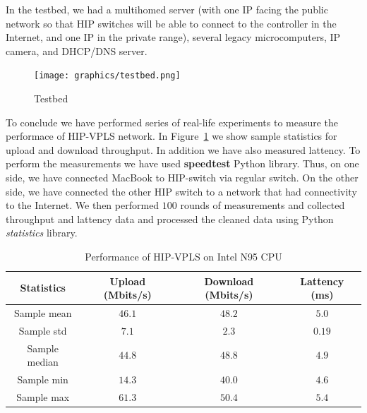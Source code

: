 In the testbed, we had a multihomed server (with one IP facing 
the public network so that HIP switches will be able to connect to 
the controller in the Internet, and one IP in the private range), 
several legacy microcomputers, IP camera, and DHCP/DNS server.

\begin{figure}[h!]
    \centering
    \texttt{[image: graphics/testbed.png]}
    \caption{Testbed}
    \label{fig:testbed}
\end{figure}

To conclude we have performed series of real-life experiments to measure the 
performace of HIP-VPLS network. In Figure~\ref{tab:vpls-performance} we show
sample statistics for upload and download throughput. In addition we have also
measured lattency. To perform the measurements we have used {\bf speedtest}
Python library. Thus, on one side, we have connected MacBook to HIP-switch via regular
switch. On the other side, we have connected the other HIP switch to a network 
that had connectivity to the Internet. We then performed $100$ rounds of measurements
and collected throughput and lattency data and processed the cleaned data using Python
{\it statistics} library.

\begin{table}
    \centering
    \begin{tabular}{|c|c|c|c|}
    \hline
    Statistics     & Upload (Mbits/s)        & Download (Mbits/s)     & Lattency (ms) \\\hline
    Sample mean    & $46.1$                  & $48.2$                 & $5.0$         \\
    Sample std     & $7.1$                   & $2.3$                  & $0.19$        \\
    Sample median  & $44.8$                  & $48.8$                 & $4.9$         \\
    Sample min     & $14.3$                  & $40.0$                 & $4.6$         \\
    Sample max     & $61.3$                  & $50.4$                 & $5.4$         \\
    \hline
    \end{tabular}
    \caption{Performance of HIP-VPLS on Intel N95 CPU}  
    \label{tab:vpls-performance}
\end{table}


